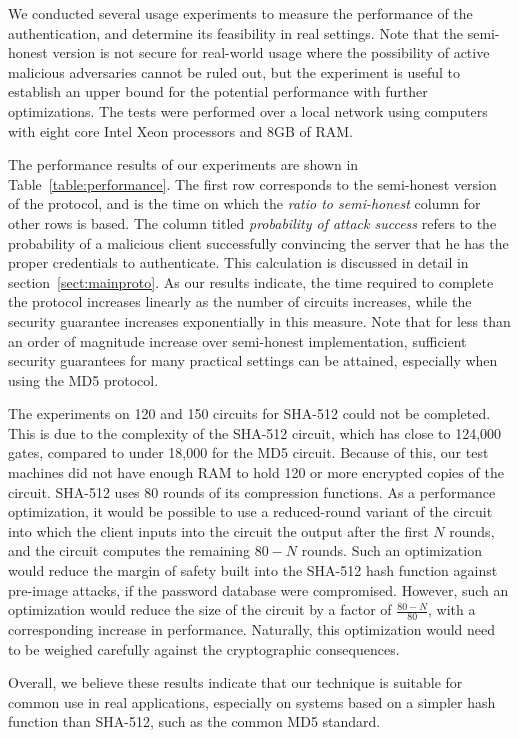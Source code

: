 We conducted several usage experiments to measure the performance of
the authentication, and determine its feasibility in real
settings. Note that the semi-honest version is not secure for
real-world usage where the possibility of active malicious adversaries
cannot be ruled out, but the experiment is useful to establish an
upper bound for the potential performance with further
optimizations. The tests were performed over a local network using
computers with eight core Intel Xeon processors and 8GB of RAM.

The performance results of our experiments are shown in
Table~\ref{table:performance}. The first row corresponds to the
semi-honest version of the protocol, and is the time on which the
\emph{ratio to semi-honest} column for other rows is based. The column
titled \emph{probability of attack success} refers to the probability
of a malicious client successfully convincing the server that he has
the proper credentials to authenticate. This calculation is discussed
in detail in section~\ref{sect:mainproto}. As our results indicate,
the time required to complete the protocol increases linearly as the
number of circuits increases, while the security guarantee increases
exponentially in this measure. Note that for less than an order of
magnitude increase over semi-honest implementation, sufficient
security guarantees for many practical settings can be attained, especially
when using the MD5 protocol.

The experiments on 120 and 150 circuits for SHA-512 could not be completed.
This is due to the complexity of the SHA-512 circuit, which has close to 124,000 gates, compared to under 18,000 for the MD5 circuit. 
Because of this, our test machines did not have enough RAM to hold 120 or more encrypted copies of the circuit.
SHA-512 uses 80 rounds of its compression functions. As a performance optimization, it would be 
possible to use a reduced-round variant of the circuit into which the client inputs into 
the circuit the output after the first $N$ rounds, and the circuit computes the 
remaining $80-N$ rounds. Such an optimization would reduce the margin of safety built 
into the SHA-512 hash function against pre-image attacks, if the password database were compromised. 
However, such an optimization would reduce the size of the circuit by a factor of $\frac{80-N}{80}$,
with a corresponding increase in performance. Naturally, this optimization would need to be
weighed carefully against the cryptographic consequences.

Overall, we believe these results indicate that our technique is suitable for common use in real
applications, especially on systems based on a simpler hash function than SHA-512, such as the common MD5 standard.


